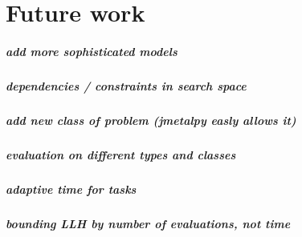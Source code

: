 \chapter{Future work}
\paragraph{add more sophisticated models}
\paragraph{dependencies / constraints in search space}
\paragraph{add new class of problem (jmetalpy easly allows it)}
\paragraph{evaluation on different types and classes}
\paragraph{adaptive time for tasks}
\paragraph{bounding LLH by number of evaluations, not time}

